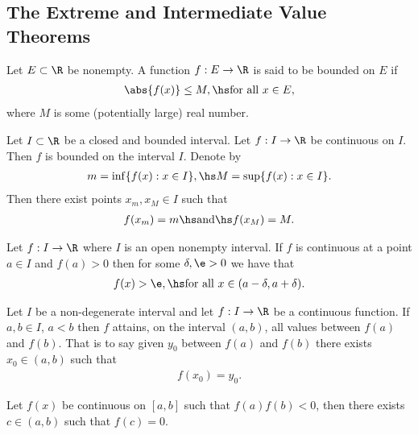 \documentclass{article}
\begin{document}
\subsection{The Extreme and Intermediate Value Theorems}

\begin{definition}
    Let $E\subset\R$ be nonempty. A function $f:E\to\R$ is said to be
    bounded on $E$ if
    \begin{align*}
        \abs{f(x)}\leq M,\hs\text{for all } x\in E,
    \end{align*}
    where $M$ is some (potentially large) real number.
\end{definition}

\begin{theorem}
    Let $I\subset\R$ be a closed and bounded interval. Let
    $f:I\to\R$ be continuous on $I$. Then $f$ is bounded on the interval
    $I$. Denote by
    \begin{align*}
        m=\inf\{f(x):x\in I\},\hs M=\sup\{f(x):x\in I\}.
    \end{align*}
    Then there exist points $x_m,x_M\in I$ such that
    \begin{align*}
        f(x_m)=m\hs\text{and}\hs f(x_M)=M.
    \end{align*}
\end{theorem}

\setcounter{theorem}{3}
\begin{lemma}
    Let $f:I\to\R$ where $I$ is an open nonempty interval. If $f$ is
    continuous at a point $a\in I$ and $f(a)>0$ then for some
    $\delta,\e>0$ we have that
    \begin{align*}
        f(x)>\e,\hs \text{for all }x\in(a-\delta, a+\delta).
    \end{align*}
\end{lemma}

\begin{theorem}
    Let $I$ be a non-degenerate interval and let $f:I\to\R$ be a
    continuous function. If $a,b\in I$, $a<b$ then $f$ attains,
    on the interval $(a,b)$, all values between $f(a)$ and $f(b)$.
    That is to say given $y_0$ between $f(a)$ and $f(b)$ there
    exists $x_0\in(a,b)$ such that
    \begin{align*}
        f(x_0)=y_0.
    \end{align*}
\end{theorem}

\begin{theorem}
    Let $f(x)$ be continuous on $[a,b]$ such that $f(a)f(b)<0$,
    then there exists $c\in(a,b)$ such that $f(c)=0$.
\end{theorem}
\end{document}
